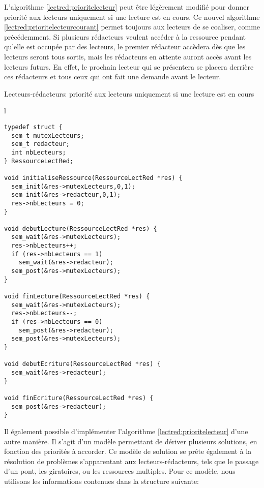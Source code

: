 L'algorithme \ref{lectred:prioritelecteur} peut être légèrement modifié pour donner priorité aux lecteurs uniquement si une lecture est en cours.
Ce nouvel algorithme \ref{lectred:prioritelecteurcourant} permet toujours aux lecteurs de se coaliser, comme précédemment. Si plusieurs rédacteurs veulent accéder à la ressource pendant qu'elle est occupée par des lecteurs, le premier rédacteur accèdera dès que les lecteurs seront tous sortis, mais les rédacteurs en attente auront accès avant les lecteurs futurs. En effet, le prochain lecteur qui se présentera se placera derrière ces rédacteurs et tous ceux qui ont fait une demande avant le lecteur.

\begin{algorithm}[h!tp]
\caption{Lecteurs-rédacteurs: priorité aux lecteurs uniquement si une lecture est en cours}\label{lectred:prioritelecteurcourant}
\begin{center}
\begin{tabular}{l}
\lstset{language=C++}
\begin{lstlisting}
typedef struct {
  sem_t mutexLecteurs;
  sem_t redacteur;
  int nbLecteurs;
} RessourceLectRed;

void initialiseRessource(RessourceLectRed *res) {
  sem_init(&res->mutexLecteurs,0,1);
  sem_init(&res->redacteur,0,1);
  res->nbLecteurs = 0;
}

void debutLecture(RessourceLectRed *res) {
  sem_wait(&res->mutexLecteurs);
  res->nbLecteurs++;
  if (res->nbLecteurs == 1)
    sem_wait(&res->redacteur);
  sem_post(&res->mutexLecteurs);
}

void finLecture(RessourceLectRed *res) {
  sem_wait(&res->mutexLecteurs);
  res->nbLecteurs--;
  if (res->nbLecteurs == 0)
    sem_post(&res->redacteur);
  sem_post(&res->mutexLecteurs);
}

void debutEcriture(RessourceLectRed *res) {
  sem_wait(&res->redacteur);
}

void finEcriture(RessourceLectRed *res) {
  sem_post(&res->redacteur);
}
\end{lstlisting}
\end{tabular}
\end{center}
\end{algorithm}

Il également possible d'implémenter l'algorithme \ref{lectred:prioritelecteur} d'une autre manière. Il s'agit d'un modèle permettant de dériver plusieurs solutions, en fonction des priorités à accorder. Ce modèle de solution se prête également à la résolution de problèmes s'apparentant aux lecteurs-rédacteurs, tels que le passage d'un pont, les giratoires, ou les ressources multiples. Pour ce modèle, nous utilisons les informations contenues dans la structure suivante:

